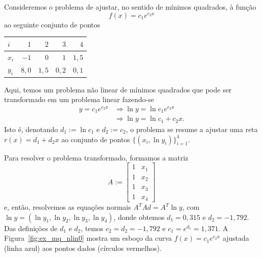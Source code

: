\begin{ex}\label{ex:mq_nlin0}
  Consideremos o problema de ajustar, no sentido de mínimos quadrados, à função
  \begin{equation}
    f(x) = c_1e^{c_2x}
  \end{equation}
ao seguinte conjunto de pontos
\begin{center}
  \begin{tabular}{l|rrrr}
    $i$ & $1$ & $2$ & $3$ & $4$ \\\hline
    $x_i$ & $-1$ & $0$ & $1$ & $1,5$\\
    $y_i$ & $8,0$ & $1,5$ & $0,2$ & $0,1$\\\hline
  \end{tabular}
\end{center}

Aqui, temos um problema não linear de mínimos quadrados que pode ser transformado em um problema linear fazendo-se
\begin{align}
  y = c_1e^{c_2x} &\Rightarrow \ln y = \ln c_1e^{c_2x}\\
                  &\Rightarrow \ln y = \ln c_1 + c_2x.
\end{align}
Isto é, denotando $d_1 := \ln c_1$ e $d_2 := c_2$, o problema se resume a ajustar uma reta $r(x) = d_1 + d_2x$ ao conjunto de pontos $\{(x_i, \ln y_i)\}_{i=1}^4$. 

Para resolver o problema transformado, formamos a matriz
\begin{equation}
  A :=
  \begin{bmatrix}
    1 & x_1 \\
    1 & x_2 \\
    1 & x_3 \\
    1 & x_4
  \end{bmatrix}
\end{equation}
e, então, resolvemos as equações normais $A^TAd = A^T\ln y$, com $\ln y = (\ln y_1, \ln y_2, \ln y_3, \ln y_4)$, donde obtemos $d_1=0,315$ e $d_2=-1,792$. Das definições de $d_1$ e $d_2$, temos $c_2 = d_2 = -1,792$ e $c_1 = e^{d_1} = 1,371$. A Figura~\ref{fig:ex_mq_nlin0} mostra um esboço da curva $f(x) = c_1e^{c_2x}$ ajustada (linha azul) aos pontos dados (círculos vermelhos).


\end{ex}
